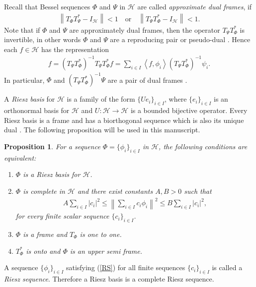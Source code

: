 \documentclass{birkjour}
\newtheorem{prop}[thm]{Proposition}
\theoremstyle{definition}
\theoremstyle{remark}
\numberwithin{equation}{section}
\begin{document}
Recall that  Bessel sequences $\Phi$ and  $\Psi$  in $\mathcal{H}$ are called  \textit{approximate dual frames}, if
\begin{eqnarray*}
\left\|T_{\Phi}T_{\Psi}^*-I_{\mathcal{H}}\right\|< 1\quad \textrm{or}\quad \left\|T_{\Psi}T_{\Phi}^*-I_{\mathcal{H}}\right\|< 1.
\end{eqnarray*}
Note that if $\Phi$ and $\Psi$ are approximately dual frames, then the operator $T_{\Psi}T_{\Phi}^{*}$ is invertible, in other words $\Phi$ and $\Psi$ are a reproducing pair \cite{spexxl14} or pseudo-dual \cite{liog04}.
Hence each $f\in \mathcal{H}$ has the representation
\begin{eqnarray*}
f=(T_{\Psi}T_{\Phi}^{*})^{-1}T_{\Psi}T_{\Phi}^{*}f=\sum_{i\in I}\left\langle f,\phi_{i}\right\rangle (T_{\Psi}T_{\Phi}^{*})^{-1}\psi_{i}.
\end{eqnarray*}
In particular, $\Phi$ and $(T_{\Psi}T_{\Phi}^{*})^{-1}\Psi$ are a pair of dual frames \cite{appchr}.

A \textit{Riesz basis} for $\mathcal{H}$ is a family of the form $\{Ue_{i}\}_{i\in I}$, where $\{e_{i}\}_{i\in I}$ is an orthonormal basis for $\mathcal{H}$ and $U:\mathcal{H}\rightarrow \mathcal{H}$ is a bounded bijective operator. Every Riesz basis is a frame and has a biorthogonal sequence which is also its unique dual  \cite{Chr08}.
The following proposition will be used in this manuscript.
\begin{prop}\label{Eq.cond.Riesz}\cite{xxlstoeant11,Chr08}
For a sequence $\Phi= \{\phi_{i}\}_{i\in I}$ in $\mathcal{H}$, the following conditions are equivalent:
\begin{enumerate}
\item\label{Re1} $\Phi$ is a Riesz basis for $\mathcal{H}$.
    \item\label{Re2} $\Phi$ is complete in $\mathcal{H}$ and there exist constants $A,B>0$ such that
        \begin{eqnarray}\label{RS}
        A\sum_{i\in I}\left|c_{i}\right|^{2}\leq \left\|\sum_{i\in I}c_{i}\phi_{i}\right\|^{2}\leq B\sum_{i\in I}\left|c_{i}\right|^{2},
        \end{eqnarray}
                for every finite scalar sequence $\{c_{i}\}_{i\in I}$.
                \item\label{Re3}  ${\Phi}$ is a frame and $T_{\Phi}$ is one to one.
        \item\label{Re4} $T_{\Phi}^{*}$ is onto  and ${\Phi}$ is an upper semi frame.
\end{enumerate}
\end{prop}
A sequence $\{\phi_{i}\}_{i\in I}$ satisfying (\ref{RS}) for all finite sequences $\{c_{i}\}_{i\in I}$ is called a \textit{Riesz sequence}.
Therefore a Riesz basis is a complete Riesz sequence.
\end{document}
